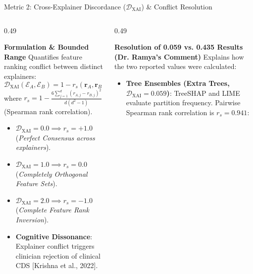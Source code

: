 \documentclass[aspectratio=169,10pt]{beamer}
\begin{document}
\begin{frame}{Metric 2: Cross-Explainer Discordance ($\mathcal{D}_{\text{XAI}}$) \& Conflict Resolution}
  \vspace{-0.15cm}
  \begin{columns}[t]
    \begin{column}{0.49\textwidth}
      \begin{block}{\textbf{Formulation \& Bounded Range}}
        \scriptsize
        Quantifies feature ranking conflict between distinct explainers:
        \vspace{1pt}
        $$\mathcal{D}_{\text{XAI}}(\mathcal{E}_A, \mathcal{E}_B) = 1 - r_s(\mathbf{r}_A, \mathbf{r}_B) \in [0.0, 2.0]$$
        where $r_s = 1 - \frac{6 \sum_{j=1}^{d} (r_{A,j} - r_{B,j})^2}{d(d^2 - 1)}$ (Spearman rank correlation).
        \vspace{2pt}
        \begin{itemize}\setlength\itemsep{1.5pt}
          \item $\mathcal{D}_{\text{XAI}} = 0.0 \implies r_s = +1.0$ (\textit{Perfect Consensus across explainers}).
          \item $\mathcal{D}_{\text{XAI}} = 1.0 \implies r_s = 0.0$ (\textit{Completely Orthogonal Feature Sets}).
          \item $\mathcal{D}_{\text{XAI}} = 2.0 \implies r_s = -1.0$ (\textit{Complete Feature Rank Inversion}).
          \item \textbf{Cognitive Dissonance}: Explainer conflict triggers clinician rejection of clinical CDS [Krishna et al., 2022].
        \end{itemize}
      \end{block}
    \end{column}
    \begin{column}{0.49\textwidth}
      \begin{exampleblock}{\textbf{Resolution of 0.059 vs. 0.435 Results (Dr. Ramya's Comment)}}
        \scriptsize
        Explains how the two reported values were calculated:
        \vspace{2pt}
        \begin{itemize}\setlength\itemsep{1.5pt}
          \item \textbf{Tree Ensembles (Extra Trees, $\mathcal{D}_{\text{XAI}} = 0.059$)}:
          TreeSHAP and LIME evaluate partition frequency. Pairwise Spearman rank correlation is $r_s = 0.941$:

\end{itemize}
\end{exampleblock}
\end{column}
\end{columns}
\end{frame}
\end{document}
